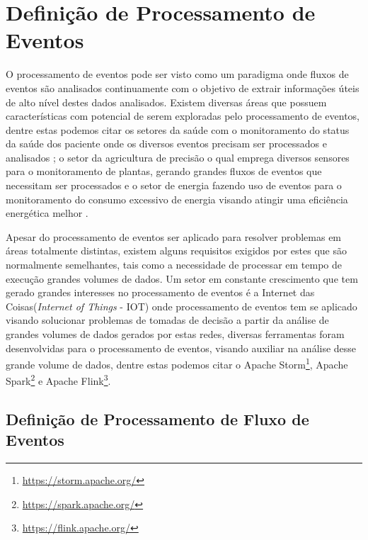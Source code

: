 \documentclass[tid,table]{texufpel} %
\begin{document}
\section{Definição de Processamento de Eventos}
O processamento de eventos pode ser visto como um paradigma onde fluxos de eventos são analisados continuamente com o objetivo de extrair informações úteis de alto nível destes dados analisados. Existem diversas áreas que possuem características com potencial de serem exploradas pelo processamento de eventos, dentre estas podemos citar os setores da saúde com o monitoramento do status da saúde dos paciente onde os diversos eventos precisam ser processados e analisados \cite{weiner2008health}; o setor da agricultura de precisão o qual emprega diversos sensores para o monitoramento de plantas, gerando grandes fluxos de eventos que necessitam ser processados \cite{garcia2011wireless} e o setor de energia fazendo uso de eventos para o monitoramento do consumo excessivo de energia visando atingir uma eficiência energética melhor \cite{vijayaraghavan2010automated}. 

Apesar do processamento de eventos ser aplicado para resolver problemas em áreas totalmente distintas, existem alguns requisitos exigidos por estes que são normalmente semelhantes, tais como a necessidade de processar em tempo de execução grandes volumes de dados. Um setor em constante  crescimento que tem gerado grandes interesses no processamento de eventos é a Internet das Coisas(\textit{Internet of Things} - IOT) onde processamento de eventos tem se aplicado visando solucionar problemas de tomadas de decisão a partir da análise de grandes volumes de dados gerados por estas redes, diversas ferramentas foram desenvolvidas para o processamento de eventos, visando auxiliar na análise desse grande volume de dados, dentre estas podemos citar o Apache Storm\footnote{\url{https://storm.apache.org/}}, Apache Spark\footnote{\url{https://spark.apache.org/}} e Apache Flink\footnote{\url{https://flink.apache.org/}}.

\subsection{Definição de Processamento de Fluxo de Eventos}
\end{document}
